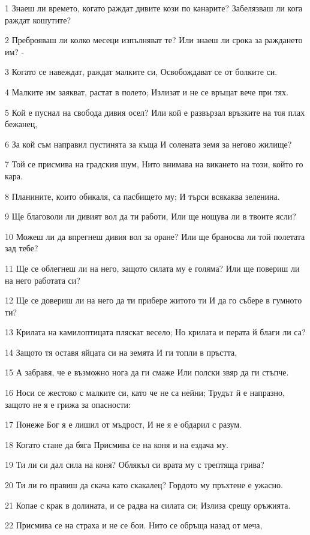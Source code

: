 \par 1 Знаеш ли времето, когато раждат дивите кози по канарите? Забелязваш ли кога раждат кошутите?
\par 2 Преброяваш ли колко месеци изпълняват те? Или знаеш ли срока за раждането им? -
\par 3 Когато се навеждат, раждат малките си, Освобождават се от болките си.
\par 4 Малките им заякват, растат в полето; Излизат и не се връщат вече при тях.
\par 5 Кой е пуснал на свобода дивия осел? Или кой е развързал връзките на тоя плах бежанец,
\par 6 За кой съм направил пустинята за къща И солената земя за негово жилище?
\par 7 Той се присмива на градския шум, Нито внимава на викането на този, който го кара.
\par 8 Планините, които обикаля, са пасбището му; И търси всякаква зеленина.
\par 9 Ще благоволи ли дивият вол да ти работи, Или ще нощува ли в твоите ясли?
\par 10 Можеш ли да впрегнеш дивия вол за оране? Или ще браносва ли той полетата зад тебе?
\par 11 Ще се облегнеш ли на него, защото силата му е голяма? Или ще повериш ли на него работата си?
\par 12 Ще се довериш ли на него да ти прибере житото ти И да го събере в гумното ти?
\par 13 Крилата на камилоптицата пляскат весело; Но крилата и перата й благи ли са?
\par 14 Защото тя оставя яйцата си на земята И ги топли в пръстта,
\par 15 А забравя, че е възможно нога да ги смаже Или полски звяр да ги стъпче.
\par 16 Носи се жестоко с малките си, като че не са нейни; Трудът й е напразно, защото не я е грижа за опасности:
\par 17 Понеже Бог я е лишил от мъдрост, И не я е обдарил с разум.
\par 18 Когато стане да бяга Присмива се на коня и на ездача му.
\par 19 Ти ли си дал сила на коня? Облякъл си врата му с трептяща грива?
\par 20 Ти ли го правиш да скача като скакалец? Гордото му пръхтене е ужасно.
\par 21 Копае с крак в долината, и се радва на силата си; Излиза срещу оръжията.
\par 22 Присмива се на страха и не се бои. Нито се обръща назад от меча,
